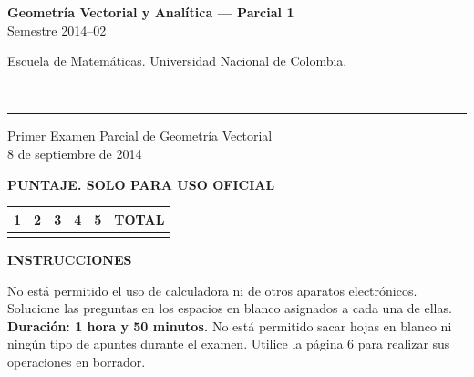 \documentclass[11pt]{article}
\newcommand{\examheader}{%
  \noindent
  \begin{minipage}[t]{0.6\linewidth}
    {\small\bfseries Geometría Vectorial y Analítica --- Parcial 1}\\
    {\small Semestre 2014--02}
  \end{minipage}%
  \hfill
  \begin{minipage}[t]{0.35\linewidth}
    \raggedleft\small Escuela de Matemáticas. Universidad Nacional de Colombia.
  \end{minipage}\\[2pt]
  \rule{\linewidth}{0.6pt}
}
\begin{document}
\examheader

\begin{center}
{\Large Primer Examen Parcial de Geometría Vectorial}\\[4pt]
{\small 8 de septiembre de 2014}
\end{center}

\vspace{10pt}
\textbf{PUNTAJE. SOLO PARA USO OFICIAL}

\begin{center}
\begin{tabular}{|c|c|c|c|c|c|}
\hline
1 & 2 & 3 & 4 & 5 & TOTAL \\
\hline
 & & & & & \\
\hline
\end{tabular}
\end{center}

\vspace{10pt}
\textbf{INSTRUCCIONES}

No está permitido el uso de calculadora ni de otros aparatos electrónicos. Solucione las preguntas en los espacios en blanco asignados a cada una de ellas. \textbf{Duración: 1 hora y 50 minutos.} No está permitido sacar hojas en blanco ni ningún tipo de apuntes durante el examen. Utilice la página 6 para realizar sus operaciones en borrador.
\end{document}
